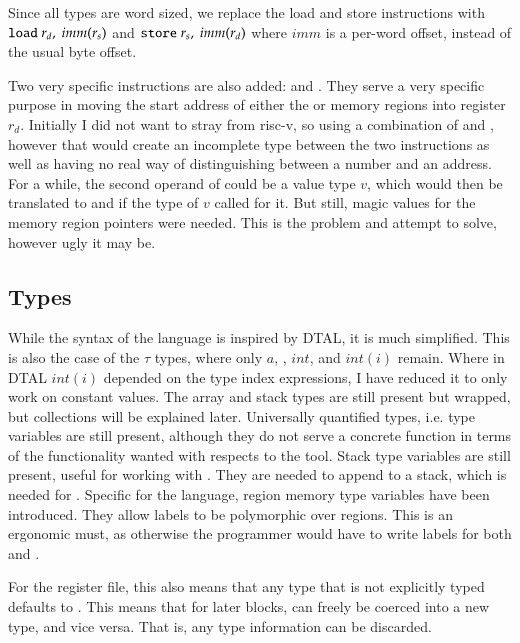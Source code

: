 Since all types are word sized, we replace the load and store instructions with
$\load\ r_d,\ imm(r_s)$ and $\store\ r_s,\ imm(r_d)$ where $imm$ is a per-word
offset, instead of the usual byte offset.

Two very specific instructions are also added: \mvscratch and \mvshared. They
serve a very specific purpose in moving the start address of either the
\scratch or \shared memory regions into register $r_d$.
Initially I did not want to stray from risc-v, so using a combination of
 and , however that would create an incomplete type between
the two instructions as well as having no real way of distinguishing between a
number and an address.
For a while, the second operand of \mv could be a value type $v$, which would
then be translated to  and  if the type of $v$ called for it.
But still, magic values for the memory region pointers were needed.
This is the problem \mvscratch and \mvshared attempt to solve, however ugly it
may be.

\subsection{Types}
While the syntax of the language is inspired by DTAL, it is much simplified.
This is also the case of the $\tau$ types, where only $a$, \ttop, $int$, and
$int(i)$ remain.
Where in DTAL $int(i)$ depended on the type index expressions, I have reduced
it to only work on constant values.
The array and stack types are still present but wrapped, but
collections will be explained later.
Universally quantified types, i.e. type variables are still present, although
they do not serve a concrete function in terms of the functionality wanted with
respects to the tool. Stack type variables are still present, useful for
working with .
They are needed to append to a stack, which is needed for \incr.
Specific for the language, region memory type variables have been introduced.
They allow labels to be polymorphic over regions. This is an ergonomic must, as
otherwise the programmer would have to write labels for both
\scratch and \shared.

For the register file, this also means that any type that is not explicitly
typed defaults to \ttop. This means that for later blocks, \ttop can freely be
coerced into a new type, and vice versa. That is, any type information can be
discarded.


